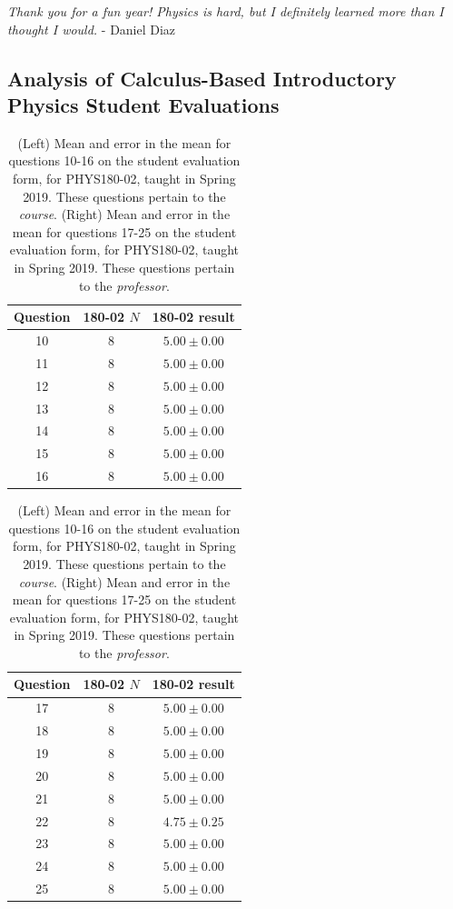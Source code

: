 \documentclass[../../main.tex]{subfiles}
\begin{document}
\textit{Thank you for a fun year!  Physics is hard, but I definitely learned more than I thought I would.} - Daniel Diaz \\ \hspace{0.1cm}

\subsection{Analysis of Calculus-Based Introductory Physics Student Evaluations}

\begin{table}
\small
\centering
\begin{tabular}{| c | c | c |}
\hline \hline
Question & 180-02 $N$ & 180-02 result \\ \hline
10 & 8 & $5.00\pm 0.00$ \\ \hline
11 & 8 & $5.00\pm 0.00$ \\ \hline
12 & 8 & $5.00\pm 0.00$ \\ \hline
13 & 8 & $5.00\pm 0.00$ \\ \hline
14 & 8 & $5.00\pm 0.00$ \\ \hline
15 & 8 & $5.00\pm 0.00$ \\ \hline
16 & 8 & $5.00\pm 0.00$ \\ \hline
\hline
\end{tabular}
\quad
\begin{tabular}{| c | c | c |}
\hline \hline
Question & 180-02 $N$ & 180-02 result \\ \hline
17 & 8 & $5.00\pm 0.00$ \\ \hline
18 & 8 & $5.00\pm 0.00$ \\ \hline
19 & 8 & $5.00\pm 0.00$ \\ \hline
20 & 8 & $5.00\pm 0.00$ \\ \hline
21 & 8 & $5.00\pm 0.00$ \\ \hline
22 & 8 & $4.75\pm 0.25$ \\ \hline
23 & 8 & $5.00\pm 0.00$ \\ \hline
24 & 8 & $5.00\pm 0.00$ \\ \hline
25 & 8 & $5.00\pm 0.00$ \\ \hline
\hline
\end{tabular}
\caption{\label{tab:courses:intro_eval_3} (Left) Mean and error in the mean for questions 10-16 on the student evaluation form, for PHYS180-02, taught in Spring 2019.  These questions pertain to the \textit{course}.  (Right) Mean and error in the mean for questions 17-25 on the student evaluation form, for PHYS180-02, taught in Spring 2019.  These questions pertain to the \textit{professor}.}
\end{table}
\end{document}
